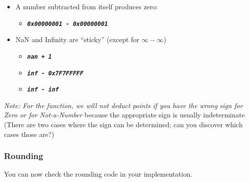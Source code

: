 \begin{itemize}
\begin{itemize}
    \end{itemize}
    \item A number subtracted from itself produces zero:
    \begin{itemize}
        \item[] \texttt{\textbf{\textit{0x00000001 - 0x00000001}}}
    \end{itemize}
    \item NaN and Infinity are ``sticky'' (except for $\infty - \infty$)
    \begin{itemize}
        \item[] \texttt{\textbf{\textit{nan + 1}}}
        \item[] \texttt{\textbf{\textit{inf - 0x7F7FFFFF}}}
        \item[] \texttt{\textbf{\textit{inf - inf}}}
    \end{itemize}
\end{itemize}

\textit{Note: For the  function, we will not deduct points if you have the wrong sign for Zero or for Not-a-Number} because the appropriate sign is usually indeterminate
(There are two cases where the sign can be determined; can you discover which cases those are?)

\subsubsection*{Rounding}

You can now check the rounding code in your  implementation.

